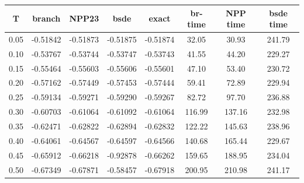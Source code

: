 \begin{tabular}{cccccccc}
\toprule
T & branch & NPP23 & bsde & exact & br-time & NPP time & bsde time \\
\midrule
0.05 & -0.51842 & -0.51873 & -0.51875 & -0.51874 & 32.05 & 30.93 & 241.79 \\
0.10 & -0.53767 & -0.53744 & -0.53747 & -0.53743 & 41.55 & 44.20 & 229.27 \\
0.15 & -0.55464 & -0.55603 & -0.55606 & -0.55601 & 47.10 & 53.40 & 230.72 \\
0.20 & -0.57162 & -0.57449 & -0.57453 & -0.57444 & 59.41 & 72.89 & 229.94 \\
0.25 & -0.59134 & -0.59271 & -0.59290 & -0.59267 & 82.72 & 97.70 & 236.88 \\
0.30 & -0.60703 & -0.61064 & -0.61092 & -0.61064 & 116.99 & 137.16 & 232.98 \\
0.35 & -0.62471 & -0.62822 & -0.62894 & -0.62832 & 122.22 & 145.63 & 238.96 \\
0.40 & -0.64061 & -0.64567 & -0.64597 & -0.64566 & 140.68 & 165.44 & 229.67 \\
0.45 & -0.65912 & -0.66218 & -0.92878 & -0.66262 & 159.65 & 188.95 & 234.04 \\
0.50 & -0.67349 & -0.67871 & -0.58457 & -0.67918 & 200.95 & 210.98 & 241.17 \\
\bottomrule
\end{tabular}

